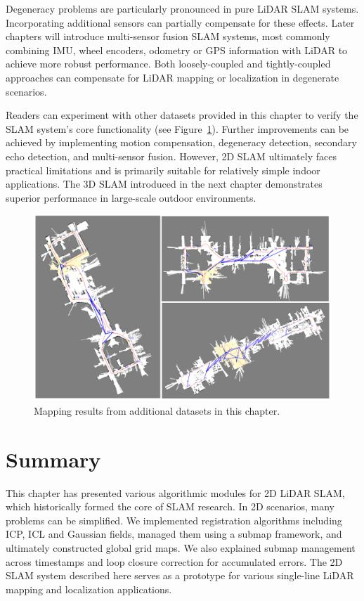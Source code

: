 Degeneracy problems are particularly pronounced in pure LiDAR SLAM systems. Incorporating additional sensors can partially compensate for these effects. Later chapters will introduce multi-sensor fusion SLAM systems, most commonly combining IMU, wheel encoders, odometry or GPS information with LiDAR to achieve more robust performance. Both loosely-coupled and tightly-coupled approaches can compensate for LiDAR mapping or localization in degenerate scenarios.

Readers can experiment with other datasets provided in this chapter to verify the SLAM system's core functionality (see Figure~\ref{fig:other-results}). Further improvements can be achieved by implementing motion compensation, degeneracy detection, secondary echo detection, and multi-sensor fusion. However, 2D SLAM ultimately faces practical limitations and is primarily suitable for relatively simple indoor applications. The 3D SLAM introduced in the next chapter demonstrates superior performance in large-scale outdoor environments.

\begin{figure}[!t]
	\centering
	\includegraphics[width=1.0\textwidth]{resources/2d-lidar-mapping/other-results.pdf}
	\caption{Mapping results from additional datasets in this chapter.}
	\label{fig:other-results}
\end{figure}

\section{Summary}
This chapter has presented various algorithmic modules for 2D LiDAR SLAM, which historically formed the core of SLAM research. In 2D scenarios, many problems can be simplified. We implemented registration algorithms including ICP, ICL and Gaussian fields, managed them using a submap framework, and ultimately constructed global grid maps. We also explained submap management across timestamps and loop closure correction for accumulated errors. The 2D SLAM system described here serves as a prototype for various single-line LiDAR mapping and localization applications.

